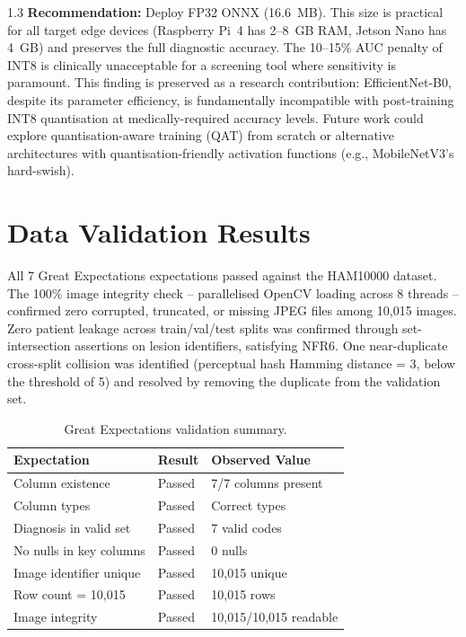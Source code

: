 \begin{spacing}{1.3}
\textbf{Recommendation:} Deploy FP32 ONNX (16.6~MB). This size is practical for all target edge devices (Raspberry Pi~4 has 2--8~GB RAM, Jetson Nano has 4~GB) and preserves the full diagnostic accuracy. The 10--15\% AUC penalty of INT8 is clinically unacceptable for a screening tool where sensitivity is paramount. This finding is preserved as a research contribution: EfficientNet-B0, despite its parameter efficiency, is fundamentally incompatible with post-training INT8 quantisation at medically-required accuracy levels. Future work could explore quantisation-aware training (QAT) from scratch or alternative architectures with quantisation-friendly activation functions (e.g., MobileNetV3's hard-swish).

\section{Data Validation Results}

All 7 Great Expectations expectations passed against the HAM10000 dataset. The 100\% image integrity check -- parallelised OpenCV loading across 8 threads -- confirmed zero corrupted, truncated, or missing JPEG files among 10,015 images. Zero patient leakage across train/val/test splits was confirmed through set-intersection assertions on lesion identifiers, satisfying NFR6. One near-duplicate cross-split collision was identified (perceptual hash Hamming distance = 3, below the threshold of 5) and resolved by removing the duplicate from the validation set.

\begin{table}[H]
\centering
\caption{Great Expectations validation summary.}
\label{tab:ge}
\begin{tabular}{lll}
\toprule
\textbf{Expectation} & \textbf{Result} & \textbf{Observed Value} \\
\midrule
Column existence              & Passed & 7/7 columns present \\
Column types                  & Passed & Correct types \\
Diagnosis in valid set        & Passed & 7 valid codes \\
No nulls in key columns       & Passed & 0 nulls \\
Image identifier unique       & Passed & 10,015 unique \\
Row count = 10,015            & Passed & 10,015 rows \\
Image integrity               & Passed & 10,015/10,015 readable \\
\bottomrule
\end{tabular}
\end{table}


\end{spacing}
